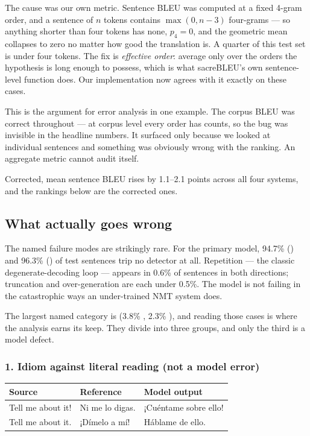 \documentclass[11pt,a4paper]{article}
\begin{document}
The cause was our own metric. Sentence BLEU was computed at a fixed 4-gram
order, and a sentence of $n$ tokens contains $\max(0, n-3)$ four-grams --- so
anything shorter than four tokens has none, $p_4 = 0$, and the geometric mean
collapses to zero no matter how good the translation is. A quarter of this test
set is under four tokens. The fix is \emph{effective order}: average only over the
orders the hypothesis is long enough to possess, which is what sacreBLEU's
own sentence-level function does. Our implementation now agrees with it exactly
on these cases.

\begin{keypoint}
This is the argument for error analysis in one example. The corpus BLEU was
correct throughout --- at corpus level every order has counts, so the bug was
invisible in the headline numbers. It surfaced only because we looked at
individual sentences and something was obviously wrong with the ranking. An
aggregate metric cannot audit itself.
\end{keypoint}

Corrected, mean sentence BLEU rises by 1.1--2.1 points across all four systems,
and the rankings below are the corrected ones.

\subsection{What actually goes wrong}

The named failure modes are strikingly rare. For the primary model, 94.7\%
(\entos) and 96.3\% (\estoen) of test sentences trip no detector at all.
Repetition --- the classic degenerate-decoding loop --- appears in 0.6\% of
sentences in both directions; truncation and over-generation are each under
0.5\%. The model is not failing in the catastrophic ways an under-trained NMT
system does.

The largest named category is  (3.8\% \entos{},
2.3\% \estoen), and reading those cases is where the analysis earns its keep.
They divide into three groups, and only the third is a model defect.

\subsubsection*{1. Idiom against literal reading (not a model error)}

\begin{center}
\small
\begin{tabular}{@{}lll@{}}
\toprule
Source & Reference & Model output \\
\midrule
Tell me about it! & Ni me lo digas. & ¡Cuéntame sobre ello! \\
Tell me about it. & ¡Dímelo a mí! & Háblame de ello. \\
\bottomrule
\end{tabular}
\end{center}
\end{document}
